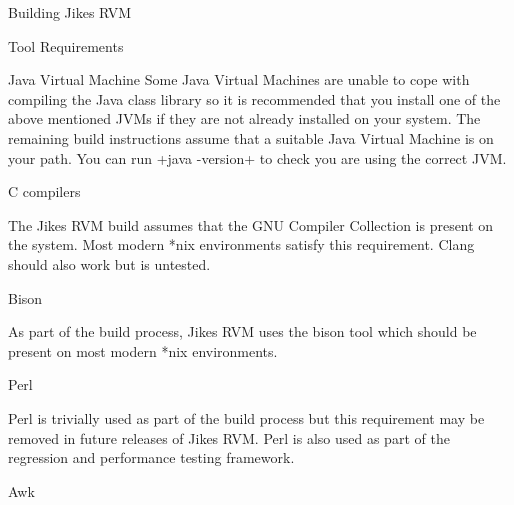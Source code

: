 \begin{section}{Building Jikes RVM}
\begin{subsection}{Tool Requirements}
\begin{subsubsection}{Java Virtual Machine}
Some Java Virtual Machines are unable to cope with compiling the Java class library so it is recommended that you install one of the above mentioned JVMs if they are not already installed on your system. The remaining build instructions assume that a suitable Java Virtual Machine is on your path. You can run \spverb+java -version+ to check you are using the correct JVM.

\end{subsubsection}


\begin{subsubsection}{C compilers}

The Jikes RVM build assumes that the GNU Compiler Collection is present on the system. Most modern *nix environments satisfy this requirement. Clang should also work but is untested.

\end{subsubsection}

\begin{subsubsection}{Bison}

As part of the build process, Jikes RVM uses the bison tool which should be present on most modern *nix environments.

\end{subsubsection}

\begin{subsubsection}{Perl}

Perl is trivially used as part of the build process but this requirement may be removed in future releases of Jikes RVM. Perl is also used as part of the regression and performance testing framework.

\end{subsubsection}

\begin{subsubsection}{Awk}


\end{subsubsection}
\end{subsection}
\end{section}
